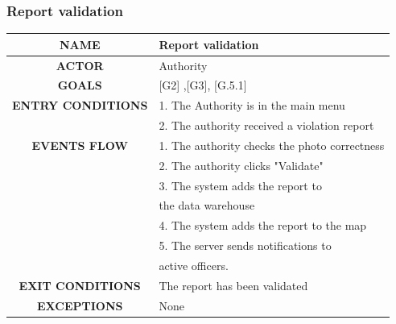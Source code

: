 \documentclass[12pt,a4paper]{article}
\begin{document}
\subsubsection{Report validation}
		\begin{center}
			\begin{tabular}{| c | l |}
				\hline
				\textbf{NAME} & Report validation \\
				\hline
				\textbf{ACTOR} & Authority \\
				\hline
				\textbf{GOALS} & [G2] ,[G3], [G.5.1] \\
				\hline
				\textbf{ENTRY CONDITIONS} &1. The Authority is in the main menu \\
				&2. The authority received a violation report \\ \hline
				\textbf{EVENTS FLOW}  &
				1. The authority checks the photo correctness\\
				&2. The authority clicks "Validate" \\
				&3. The system adds the report to  \\
				& the data warehouse \\
				&4. The system adds the report to the map \\ 
				&5. The server sends notifications to \\
				& active officers. \\
				\hline
				\textbf{EXIT CONDITIONS}  & The report has been validated \\ \hline
				\textbf{EXCEPTIONS} & None \\
				\hline
			\end{tabular}
		\end{center}
\end{document}
